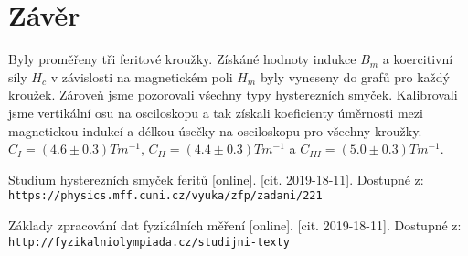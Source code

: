 \documentclass{article}
\begin{document}
\section{Závěr}
\par Byly proměřeny tři feritové kroužky. Získáné hodnoty indukce $B_m$ a koercitivní síly $H_c$ v závislosti na magnetickém poli $H_m$ byly vyneseny do grafů pro každý kroužek. Zároveň jsme pozorovali všechny typy hysterezních smyček. Kalibrovali jsme vertikální osu na osciloskopu a tak získali koeficienty úměrnosti mezi magnetickou indukcí a délkou úsečky na osciloskopu pro všechny kroužky. $C_{I} = (4.6 \pm 0.3)Tm^{-1}$, $C_{II} = (4.4 \pm 0.3)Tm^{-1}$ a $C_{III} = (5.0 \pm 0.3)Tm^{-1}$.  













\renewcommand\refname{Použitá literatura}
\begin{thebibliography}{}
Studium hysterezních smyček feritů [online]. [cit. 2019-18-11]. Dostupné z: 
\\\texttt{https://physics.mff.cuni.cz/vyuka/zfp/zadani/221}



Základy zpracování dat fyzikálních měření [online]. [cit. 2019-18-11].
\newline Dostupné z:\\\texttt{http://fyzikalniolympiada.cz/studijni-texty}






\end{thebibliography}
\end{document}
